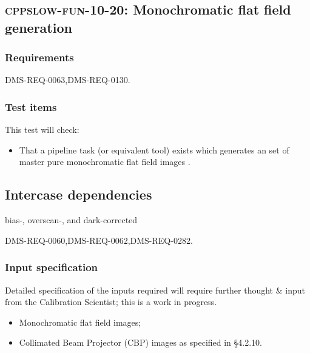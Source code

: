 \subsection{\textsc{cppslow-fun-10-20}: Monochromatic flat field generation}
\label{cppslow-fun-10-20}

\subsubsection{Requirements}

DMS-REQ-0063,DMS-REQ-0130.

\subsubsection{Test items}

This test will check:

\begin{itemize}

  \item{That a pipeline task (or equivalent tool) exists which generates an
  set of master pure monochromatic flat field images .}

\end{itemize}

\subsection{Intercase dependencies}
bias-, overscan-, and dark-corrected

DMS-REQ-0060,DMS-REQ-0062,DMS-REQ-0282.

\subsubsection{Input specification}

\begin{note}
Detailed specification of the inputs required will require further thought \&
input from the Calibration Scientist; this is a work in progress.
\end{note}

\begin{itemize}

  \item{Monochromatic flat field images;}
  \item{Collimated Beam Projector (CBP) images as specified in 
  \S4.2.10.}

\end{itemize}

